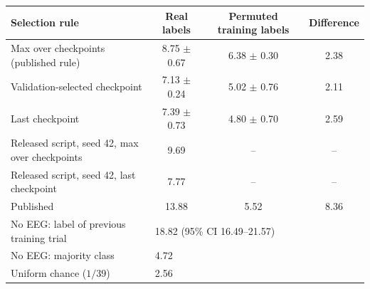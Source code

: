 \begin{tabular}{lccc}
\toprule
Selection rule & Real labels & Permuted training labels & Difference \\
\midrule
Max over checkpoints (published rule) & 8.75 $\pm$ 0.67 & 6.38 $\pm$ 0.30 & 2.38 \\
Validation-selected checkpoint & 7.13 $\pm$ 0.24 & 5.02 $\pm$ 0.76 & 2.11 \\
Last checkpoint & 7.39 $\pm$ 0.73 & 4.80 $\pm$ 0.70 & 2.59 \\
\midrule
Released script, seed 42, max over checkpoints & 9.69 & -- & -- \\
Released script, seed 42, last checkpoint & 7.77 & -- & -- \\
Published \citep[Table 3, S1]{zhang2024chisco} & 13.88 & 5.52 & 8.36 \\
\midrule
No EEG: label of previous training trial & \multicolumn{3}{l}{18.82 (95\% CI 16.49--21.57)} \\
No EEG: majority class & \multicolumn{3}{l}{4.72} \\
Uniform chance ($1/39$) & \multicolumn{3}{l}{2.56} \\
\bottomrule
\end{tabular}
